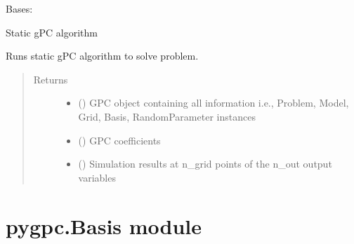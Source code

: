 \documentclass[letterpaper,10pt,english,openany,oneside]{sphinxmanual}
\begin{document}
\begin{fulllineitems}
\label{\detokenize{pygpc:pygpc.Algorithm.Static}}
Bases: {\hyperref[\detokenize{pygpc:pygpc.Algorithm.Algorithm}]{}}

Static gPC algorithm

\begin{fulllineitems}
\label{\detokenize{pygpc:pygpc.Algorithm.Static.run}}
Runs static gPC algorithm to solve problem.
\begin{quote}\begin{description}
\item[{Returns}] \leavevmode
\begin{itemize}
\item {} 
 () \textendash{} GPC object containing all information i.e., Problem, Model, Grid, Basis, RandomParameter instances

\item {} 
 () \textendash{} GPC coefficients

\item {} 
 () \textendash{} Simulation results at n\_grid points of the n\_out output variables

\end{itemize}


\end{description}\end{quote}

\end{fulllineitems}


\end{fulllineitems}



\section{pygpc.Basis module}
\label{\detokenize{pygpc:module-pygpc.Basis}}\label{\detokenize{pygpc:pygpc-basis-module}}
\end{document}
